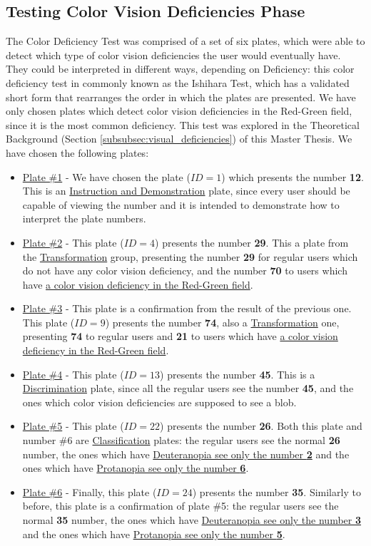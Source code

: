 \subsection{Testing Color Vision Deficiencies Phase}
\label{subsec:design_ishihara}
%
The Color Deficiency Test was comprised of a set of six plates, which were able to detect which type of color vision deficiencies the user
would eventually have. They could be interpreted in different ways, depending on Deficiency: this color deficiency test in commonly known as the
Ishihara Test, which has a validated \cite{Alwis1992} short form that rearranges the order in which the plates are presented. We have only chosen plates
which detect color vision deficiencies in the Red-Green field, since it is the most common deficiency. This test was explored
in the Theoretical Background (Section \ref{subsubsec:visual_deficiencies}) of this Master Thesis. We have chosen the following plates:
%
\begin{itemize}
	\item \ul{Plate \#1} - We have chosen \cite{Alwis1992} the plate ($ID = 1$) which presents the number \textbf{12}. This is an \ul{Instruction and
	Demonstration} plate, since every user should be capable of viewing the number and it is intended to demonstrate how to interpret the plate numbers.
	\item \ul{Plate \#2} - This plate ($ID = 4$) presents the number \textbf{29}. This a plate from the \ul{Transformation} group, presenting the number
	\textbf{29} for regular	users which do not have any color vision deficiency, and the number \textbf{70} to users which have \ul{a color vision
	deficiency in the Red-Green field}.
	\item \ul{Plate \#3} - This plate is a confirmation from the result of the previous one. This plate ($ID = 9$) presents the number \textbf{74}, also a
	\ul{Transformation} one, presenting \textbf{74} to regular users and \textbf{21} to users which have \ul{a color vision deficiency in the Red-Green field}.
	\item \ul{Plate \#4} - This plate ($ID = 13$) presents the number \textbf{45}. This is a \ul{Discrimination} plate, since all the regular users see the
	number \textbf{45}, and	the ones which color vision deficiencies are supposed to see a blob.
	\item \ul{Plate \#5} - This plate ($ID = 22$) presents the number \textbf{26}. Both this plate and number \#6 are \ul{Classification} plates: the regular users see the
	normal \textbf{26} number, the ones which have \ul{Deuteranopia see only the number \textbf{2}} and the ones which have \ul{Protanopia see only the number
	\textbf{6}}.
	\item \ul{Plate \#6} - Finally, this plate ($ID = 24$) presents the number \textbf{35}. Similarly to before, this plate is a confirmation of plate \#5: the regular users
	see the normal \textbf{35} number, the ones which have \ul{Deuteranopia see only the number \textbf{3}} and the ones which have \ul{Protanopia see
	only the number \textbf{5}}.
\end{itemize}
